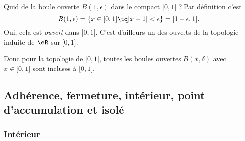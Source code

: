 \begin{example}  \label{ExKYZwYxn}
    Quid de la boule ouverte \( B(1,\epsilon)\) dans le compact \( \mathopen[ 0 , 1 \mathclose]\) ? Par définition c'est
    \begin{equation}
        B(1,\epsilon)=\{ x\in\mathopen[ 0 , 1 \mathclose]\tq | x-1 |<\epsilon \}=\mathopen] 1-\epsilon , 1 \mathclose].
    \end{equation}
    Oui, cela est \emph{ouvert} dans \( \mathopen[ 0 , 1 \mathclose]\). C'est d'ailleurs un des ouverts de la topologie induite de \( \eR\) sur \( \mathopen[ 0 , 1 \mathclose]\).

    Donc pour la topologie de \( \mathopen[ 0 , 1 \mathclose]\), toutes les boules ouvertes \( B(x,\delta)\) avec \( x\in\mathopen[ 0 , 1 \mathclose]\) sont incluses à \( \mathopen[ 0 , 1 \mathclose]\).
\end{example}


\subsection{Adhérence, fermeture, intérieur, point d'accumulation et isolé}

\subsubsection{Intérieur}

